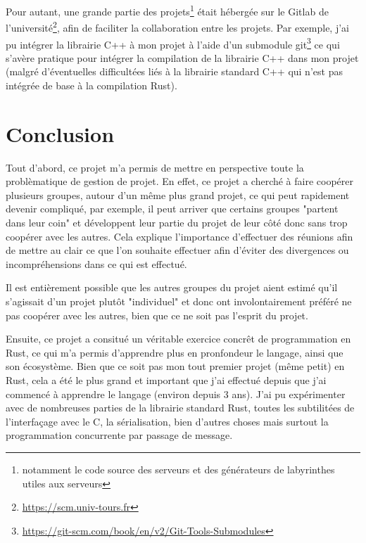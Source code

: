 \documentclass{EPUProjetDi}
\begin{document}
Pour autant, une grande partie des projets\footnote{notamment le code source des serveurs et des générateurs de labyrinthes utiles aux serveurs} était hébergée sur le Gitlab de l'université\footnote{\url{https://scm.univ-tours.fr}}, afin de faciliter la collaboration entre les projets. Par exemple, j'ai pu intégrer la librairie C++ à mon projet à l'aide d'un submodule git\footnote{\url{https://git-scm.com/book/en/v2/Git-Tools-Submodules}} ce qui s'avère pratique pour intégrer la compilation de la librairie C++ dans mon projet (malgré d'éventuelles difficultées liés à la librairie standard C++ qui n'est pas intégrée de base à la compilation Rust).

\chapter*{Conclusion}

\label{sec:conclusion}

Tout d'abord, ce projet m'a permis de mettre en perspective toute la problèmatique de gestion de projet. En effet, ce projet a cherché à faire coopérer plusieurs groupes, autour d'un même plus grand projet, ce qui peut rapidement devenir compliqué, par exemple, il peut arriver que certains groupes "partent dans leur coin" et développent leur partie du projet de leur côté donc sans trop coopérer avec les autres. Cela explique l'importance d'effectuer des réunions afin de mettre au clair ce que l'on souhaite effectuer afin d'éviter des divergences ou incompréhensions dans ce qui est effectué.

Il est entièrement possible que les autres groupes du projet aient estimé qu'il s'agissait d'un projet plutôt "individuel" et donc ont involontairement préféré ne pas coopérer avec les autres, bien que ce ne soit pas l'esprit du projet.

Ensuite, ce projet a consitué un véritable exercice concrêt de programmation en Rust, ce qui m'a permis d'apprendre plus en pronfondeur le langage, ainsi que son écosystème. Bien que ce soit pas mon tout premier projet (même petit) en Rust, cela a été le plus grand et important que j'ai effectué depuis que j'ai commencé à apprendre le langage (environ depuis 3 ans). J'ai pu expérimenter avec de nombreuses parties de la librairie standard Rust, toutes les subtilitées de l'interfaçage avec le C, la sérialisation, bien d'autres choses mais surtout la programmation concurrente par passage de message.
\end{document}
